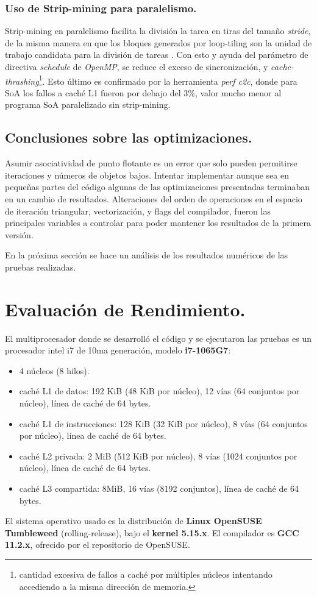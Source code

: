 \documentclass{article}
\begin{document}
\subsubsection{Uso de Strip-mining para paralelismo.\label{strip-mining-parallel}}
Strip-mining en paralelismo facilita la división la tarea en tiras del tamaño \textit{stride}, de la misma
manera en que los bloques generados por loop-tiling son la unidad de trabajo candidata para la división
de tareas \cite{Wolfe89moreiteration}. Con esto y ayuda del parámetro de directiva \textit{schedule} de \textit{OpenMP},
se reduce el exceso de sincronización, y \textit{cache-thrashing}\footnote{cantidad excesiva
de fallos a caché por múltiples núcleos intentando accediendo a la misma dirección de memoria.}. Esto último
es confirmado por la herramienta \textit{perf c2c}, donde para SoA los fallos a caché L1 fueron por debajo
del 3\%, valor mucho menor al programa SoA paralelizado sin strip-mining.

\subsection{Conclusiones sobre las optimizaciones.\label{opt_conclusiones}}
Asumir asociatividad de punto flotante es un error que solo pueden permitirse iteraciones
y números de objetos bajos. Intentar implementar aunque sea en pequeñas partes del código algunas de
las optimizaciones presentadas terminaban en un cambio de resultados. Alteraciones del orden de operaciones
en el espacio de iteración triangular, vectorización, y flags del compilador, fueron las principales
variables a controlar para poder mantener los resultados de la primera versión.

En la próxima sección se hace un análisis de los resultados numéricos de las pruebas realizadas.

\section{Evaluación de Rendimiento.\label{performance}}
El multiprocesador donde se desarrolló el código y se ejecutaron las pruebas es un
procesador intel i7 de 10ma generación, modelo \textbf{i7-1065G7}:
\begin{itemize}
	\item 4 núcleos (8 hilos).
	\item caché L1 de datos: 192 KiB (48 KiB por núcleo), 12 vías (64 conjuntos por núcleo), línea de caché de 64 bytes.
	\item caché L1 de instrucciones: 128 KiB (32 KiB por núcleo), 8 vías (64 conjuntos por núcleo), línea de caché de 64 bytes.
	\item caché L2 privada: 2 MiB (512 KiB por núcleo), 8 vías (1024 conjuntos por núcleo), línea de caché de 64 bytes.
	\item caché L3 compartida: 8MiB, 16 vías (8192 conjuntos), línea de caché de 64 bytes.
\end{itemize}
El sistema operativo usado es la distribución de \textbf{Linux OpenSUSE Tumbleweed} (rolling-release),
bajo el \textbf{kernel 5.15.x}. El compilador es \textbf{GCC 11.2.x}, ofrecido por el repositorio de OpenSUSE.
\end{document}
